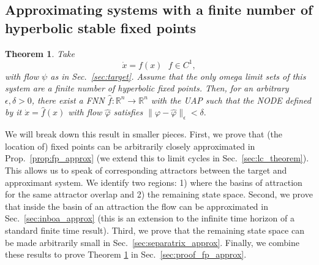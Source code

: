 \documentclass{article}
\newtheorem{theorem}{Theorem}
\theoremstyle{definition} \newtheorem{definition}{Definition}
\theoremstyle{remark} \newtheorem{remark}{Remark}
\newcommand{\reals}{\mathbb{R}}
\newcounter{ct}
\begin{document}




\subsection{Approximating systems with a finite number of hyperbolic stable fixed points}\label{sec:fp_theorem}

\begin{theorem}\label{thrm:approx}
Take 
\begin{equation}
\dot x = f(x)   \ \ \ f\in C^1,
\end{equation}
with flow $\psi$ as in Sec.~\ref{sec:target}. Assume that the only omega limit sets of this system are a finite number of hyperbolic fixed points.
%
Then, for an arbitrary $\epsilon, \delta > 0$, there exist a FNN $\hat f: \reals^n\rightarrow\reals^n$ with the UAP such that the NODE defined by it $\dot x = \hat f(x)$ %
with flow $\hat \varphi$ satisfies $\|\varphi-\hat \varphi\|_\epsilon < \delta.$
\end{theorem}


We will break down this result in smaller pieces. 
First, we prove that (the location of) fixed points can be arbitrarily closely approximated in Prop.~\ref{prop:fp_approx} (we extend this to limit cycles in Sec.~\ref{sec:lc_theorem}).
This allows us to speak of corresponding attractors between the target and approximant system.
We identify two regions: 1) where the basins of attraction for the same attractor overlap and 2) the remaining state space.
Second, we prove that inside the basin of an attraction the flow can be approximated in Sec.~\ref{sec:inboa_approx} (this is an extension to the infinite time horizon of a standard finite time result). %
Third, we prove that the remaining state space can be made arbitrarily small in Sec.~\ref{sec:separatrix_approx}.
Finally, we combine these results to prove Theorem \ref{thrm:approx} in Sec.~\ref{sec:proof_fp_approx}.
\end{document}
